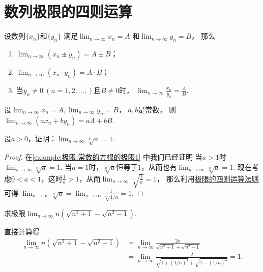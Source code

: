 \section{数列极限的四则运算}
\begin{theorem}\label{theorem:极限.数列极限的四则运算法则}
设数列\(\{x_n\}\)和\(\{y_n\}\)
满足\(\lim_{n\to\infty} x_n = A\)
和\(\lim_{n\to\infty} y_n = B\)，
那么\begin{enumerate}
	\item \(\lim_{n\to\infty} (x_n \pm y_n) = A \pm B\)；
	\item \(\lim_{n\to\infty} (x_n \cdot y_n) = A \cdot B\)；
	\item 当\(y_n \neq 0\ (n=1,2,\dotsc,)\)且\(B \neq 0\)时，
	\(\lim_{n\to\infty}{\frac{x_n}{y_n}}=\frac{A}{B}\).
\end{enumerate}
\end{theorem}

\begin{corollary}
设\(\lim_{n\to\infty} x_n = A,
\lim_{n\to\infty} y_n = B\)，
\(a,b\)是常数，
则\(\lim_{n\to\infty} (a x_n + b y_n) = a A + b B\).
\end{corollary}

\begin{example}\label{example:极限.常数的方根的极限2}
设\(a>0\)，证明：\(\lim_{n\to\infty} \sqrt[n]{a} = 1\).
\begin{proof}
在\cref{example:极限.常数的方根的极限1} 中我们已经证明
当\(a>1\)时\(\lim_{n\to\infty} \sqrt[n]{a} = 1\).
当\(a=1\)时，\(\sqrt[n]{a}\)恒等于\(1\)，从而也有\(\lim_{n\to\infty} \sqrt[n]{a} = 1\).
现在考虑\(0<a<1\)，这时\(\frac1a>1\)，从而\(\lim_{n\to\infty} \sqrt[n]{\frac1a} = 1\)，
那么利用\hyperref[theorem:极限.数列极限的四则运算法则]{极限的四则运算法则}可得
\(\lim_{n\to\infty} \sqrt[n]{a}
= \lim_{n\to\infty} \frac1{\sqrt[n]{1/a}} = 1\).
\end{proof}
\end{example}

\begin{example}
求极限\(\lim_{n\to\infty} n(\sqrt{n^2+1}-\sqrt{n^2-1})\).
\begin{solution}
直接计算得\begin{align*}
	\lim_{n\to\infty} n(\sqrt{n^2+1}-\sqrt{n^2-1})
	&= \lim_{n\to\infty} \frac{2n}{\sqrt{n^2+1}+\sqrt{n^2-1}} \\
	&= \lim_{n\to\infty} \frac2{\sqrt{1+(1/n)^2}+\sqrt{1-(1/n)^2}}
	= 1.
\end{align*}
\end{solution}
\end{example}

